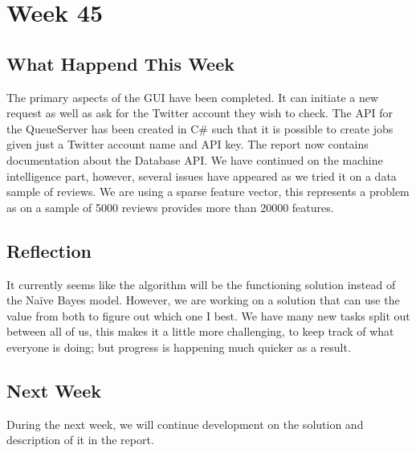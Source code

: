 \section*{Week 45}
\subsection*{What Happend This Week}
The primary aspects of the \ac{GUI} have been completed. It can initiate a new
request as well as ask for the Twitter account they wish to check. The \ac{API}
for the QueueServer has been created in C\# such that it is possible to create
jobs given just a Twitter account name and \ac{API} key. The report now contains
documentation about the Database \ac{API}. We have continued on the machine
intelligence part, however, several issues have appeared as we tried it on a
data sample of reviews. We are using a sparse feature vector, this represents a
problem as on a sample of 5000 reviews provides more than 20000 features.


\subsection*{Reflection} 
It currently seems like the algorithm will be the functioning solution instead
of the Naïve Bayes model. However, we are working on a solution that can use the
value from both to figure out which one I best. We have many new tasks split out
between all of us, this makes it a little more challenging, to keep track of
what everyone is doing; but progress is happening much quicker as a result.


\subsection*{Next Week}
During the next week, we will continue development on the solution and
description of it in the report.

